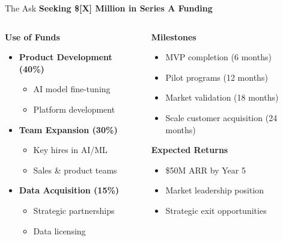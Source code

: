 \documentclass[aspectratio=169]{beamer}
\begin{document}
\begin{frame}{The Ask}
    \textbf{Seeking \$[X] Million in Series A Funding}
    
    \vspace{0.5cm}
    \begin{columns}
        \begin{column}{0.5\textwidth}
            \textbf{Use of Funds}
            \begin{itemize}
                \item \textbf{Product Development (40\%)}
                \begin{itemize}
                    \item AI model fine-tuning
                    \item Platform development
                \end{itemize}
                \item \textbf{Team Expansion (30\%)}
                \begin{itemize}
                    \item Key hires in AI/ML
                    \item Sales \& product teams
                \end{itemize}
                \item \textbf{Data Acquisition (15\%)}
                \begin{itemize}
                    \item Strategic partnerships
                    \item Data licensing
                \end{itemize}
            \end{itemize}
        \end{column}
        \begin{column}{0.5\textwidth}
            \textbf{Milestones}
            \begin{itemize}
                \item MVP completion (6 months)
                \item Pilot programs (12 months)
                \item Market validation (18 months)
                \item Scale customer acquisition (24 months)
            \end{itemize}
            
            \vspace{0.5cm}
            \textbf{Expected Returns}
            \begin{itemize}
                \item \$50M ARR by Year 5
                \item Market leadership position
                \item Strategic exit opportunities
            \end{itemize}
        \end{column}
    \end{columns}
\end{frame}
\end{document}
